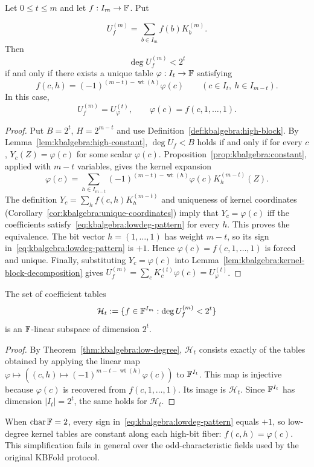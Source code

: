 \begin{theorem}\label{thm:kbalgebra:low-degree}
Let $0\leq t\leq m$ and let $f:I_m\to\mathbb{F}$. Put\par\noindent\[U_f^{(m)}=\sum_{b\in I_m}f(b)K_b^{(m)}.\] Then
\begin{equation}\label{eq:kbalgebra:lowdeg}
 \boxed{\deg U_f^{(m)}<2^t}
\end{equation}
if and only if there exists a unique table $\varphi:I_t\to\mathbb{F}$ satisfying
\begin{equation}\label{eq:kbalgebra:lowdeg-pattern}
 \boxed{f(c,h)=(-1)^{(m-t)-\operatorname{wt}(h)}\varphi(c)
 \qquad(c\in I_t,\ h\in I_{m-t}).}
\end{equation}
In this case,
\[
 U_f^{(m)}=U_\varphi^{(t)},
 \qquad \varphi(c)=f(c,1,\ldots,1).
\]
\end{theorem}
\begin{proof}
Put $B=2^t$, $H=2^{m-t}$ and use Definition~\ref{def:kbalgebra:high-block}. By Lemma~\ref{lem:kbalgebra:high-constant}, $\deg U_f<B$ holds if and only if for every $c$, $Y_c(Z)=\varphi(c)$ for some scalar $\varphi(c)$. Proposition~\ref{prop:kbalgebra:constant}, applied with $m-t$ variables, gives the kernel expansion
\[
 \varphi(c)=\sum_{h\in I_{m-t}}
 (-1)^{(m-t)-\operatorname{wt}(h)}\varphi(c)K_h^{(m-t)}(Z).
\]
The definition $Y_c=\sum_hf(c,h)K_h^{(m-t)}$ and uniqueness of kernel coordinates (Corollary~\ref{cor:kbalgebra:unique-coordinates}) imply that $Y_c=\varphi(c)$ iff the coefficients satisfy~\eqref{eq:kbalgebra:lowdeg-pattern} for every $h$. This proves the equivalence. The bit vector $h=(1,\ldots,1)$ has weight $m-t$, so its sign in~\eqref{eq:kbalgebra:lowdeg-pattern} is $+1$. Hence $\varphi(c)=f(c,1,\ldots,1)$ is forced and unique. Finally, substituting $Y_c=\varphi(c)$ into Lemma~\ref{lem:kbalgebra:kernel-block-decomposition} gives
$U_f^{(m)}=\sum_cK_c^{(t)}\varphi(c)=U_\varphi^{(t)}$.
\end{proof}

\begin{corollary}\label{cor:kbalgebra:dimension}
The set of coefficient tables
\[
 \mathcal H_t:=\{f\in\mathbb{F}^{I_m}:\deg U_f^{(m)}<2^t\}
\]
is an $\mathbb{F}$-linear subspace of dimension $2^t$.
\end{corollary}
\begin{proof}
By Theorem~\ref{thm:kbalgebra:low-degree}, $\mathcal H_t$ consists exactly of the tables obtained by applying the linear map
$\varphi\mapsto((c,h)\mapsto(-1)^{m-t-\operatorname{wt}(h)}\varphi(c))$
to $\mathbb{F}^{I_t}$. This map is injective because $\varphi(c)$ is recovered from $f(c,1,\ldots,1)$. Its image is $\mathcal H_t$. Since $\mathbb{F}^{I_t}$ has dimension $|I_t|=2^t$, the same holds for $\mathcal H_t$.
\end{proof}

\begin{remark}\label{rem:kbalgebra:lowdeg-char2}
When $\operatorname{char}\mathbb{F}=2$, every sign in~\eqref{eq:kbalgebra:lowdeg-pattern} equals $+1$, so low-degree kernel tables are constant along each high-bit fiber: $f(c,h)=\varphi(c)$. This simplification fails in general over the odd-characteristic fields used by the original KBFold protocol.
\end{remark}
